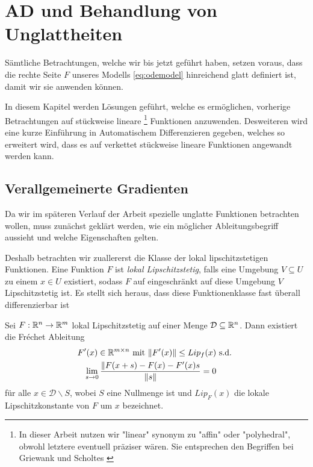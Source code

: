 \chapter{AD und Behandlung von Unglattheiten}
 Sämtliche Betrachtungen, welche wir bis jetzt geführt haben, setzen voraus, dass die rechte Seite $F$ unseres Modells \eqref{eq:odemodel} hinreichend glatt definiert ist, damit wir sie anwenden können. 

In diesem Kapitel werden Lösungen geführt, welche es ermöglichen, vorherige Betrachtungen auf stückweise lineare
\footnote{In dieser Arbeit nutzen wir "linear" synonym zu "affin" oder "polyhedral", obwohl letztere eventuell präziser wären. Sie entsprechen den Begriffen bei Griewank \cite{monster} und Scholtes \cite{scholtes2012introduction}}
Funktionen
anzuwenden. Desweiteren wird eine kurze Einführung in Automatischem Differenzieren gegeben, welches so erweitert wird, dass es auf verkettet stückweise lineare Funktionen angewandt werden kann.
\section{Verallgemeinerte Gradienten}
Da wir im späteren Verlauf der Arbeit spezielle unglatte Funktionen betrachten wollen, muss zunächst geklärt werden, wie ein möglicher Ableitungsbegriff aussieht und welche Eigenschaften gelten.

Deshalb betrachten wir zuallererst die Klasse der lokal lipschitzstetigen Funktionen. Eine Funktion $F$ ist \textit{lokal Lipschitzstetig}, falls eine Umgebung $V\subseteq U$ zu einem $x\in U$ existiert, sodass $F$ auf eingeschränkt auf diese Umgebung $V$ Lipschitzstetig ist.
Es stellt sich heraus, dass diese Funktionenklasse fast überall differenzierbar ist \cite[S.216 ff]{federer1969geometric}
\begin{theorem}[Rademacher]
 Sei $F:\mathbb{R}^n\to \mathbb{R}^m$ lokal Lipschitzstetig auf einer Menge $\mathcal D\subseteq \mathbb{R}^n$. Dann existiert die Fréchet Ableitung 
 \[
 \begin{aligned}
  F'(x)\in \mathbb{R}^{m\times n} \text{ mit } \|F'(x)\|  \leq Lip_f(x) & \text{ s.d. }\\
   \lim_{s\to 0}\frac{\|F(x+s)-F(x)-F'(x)s}{\|s\|} = 0&
  \end{aligned}
 \]
für alle $x\in \mathcal D\backslash S$, wobei $S$ eine Nullmenge ist und $Lip_F(x)$ die lokale Lipschitzkonstante von $F$ um $x$ bezeichnet.
\end{theorem}

